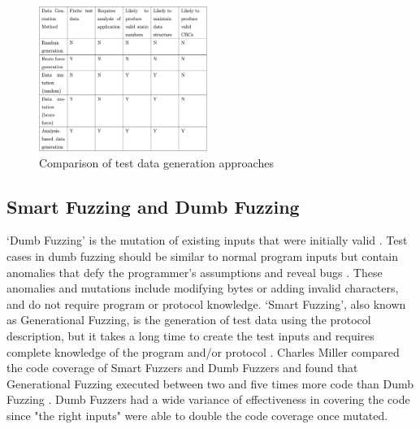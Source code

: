 \documentclass[10pt, final, journal, letterpaper, twoside, twocolumn]{IEEEtran}
\begin{document}
	\begin{figure}[t!]
		\centering
		\includegraphics[width=0.489\textwidth]{Sources/testdata}
		\caption{Comparison of test data generation approaches}
		\label{fig:testdata}
	\end{figure}
	
	\subsection{Smart Fuzzing and Dumb Fuzzing}
		`Dumb Fuzzing' is the mutation of existing inputs that were initially valid \cite{defcon4}. Test cases in dumb fuzzing should be similar to normal program inputs but contain anomalies that defy the programmer's assumptions and reveal bugs \cite{defcon4}. These anomalies and mutations include modifying bytes or adding invalid characters, and do not require program or protocol knowledge. `Smart Fuzzing', also known as Generational Fuzzing, is the generation of test data using the protocol description, but it takes a long time to create the test inputs and requires complete knowledge of the program and/or protocol \cite{defcon4}. Charles Miller compared the code coverage of Smart Fuzzers and Dumb Fuzzers and found that Generational Fuzzing executed between two and five times more code than Dumb Fuzzing \cite{defcon4}. Dumb Fuzzers had a wide variance of effectiveness in covering the code since "the right inputs" were able to double the code coverage once mutated.
	
\end{document}
